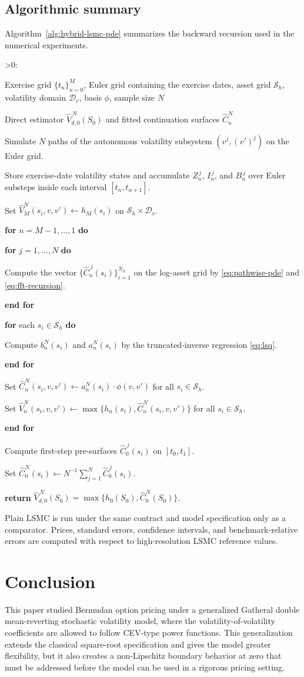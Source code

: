 \documentclass[10pt]{article}
\makeatletter
\newcounter{ALG@line}
\newenvironment{algorithmic}[1][0]{%
  \setcounter{ALG@line}{0}%
  \def\ALG@freq{#1}%
  \begin{list}{\ifnum\ALG@freq>0\refstepcounter{ALG@line}\arabic{ALG@line}:\fi}{%
    \setlength{\leftmargin}{2.2em}%
    \setlength{\labelwidth}{1.8em}%
    \setlength{\labelsep}{0.4em}%
    \setlength{\itemsep}{2pt}%
    \setlength{\parsep}{0pt}%
    \setlength{\topsep}{3pt}%
  }%
}{\end{list}}
\newcommand{\Require}{\item[\textbf{Require:}]}
\newcommand{\Ensure}{\item[\textbf{Ensure:}]}
\newcommand{\State}{\item}
\newcommand{\For}[1]{\State \textbf{for} #1 \textbf{do}}
\newcommand{\EndFor}{\State \textbf{end for}}
\theoremstyle{plain}
\theoremstyle{definition}
\theoremstyle{remark}
\makeatother
\begin{document}
\subsection{Algorithmic summary}
\label{subsec:algorithmic-summary}
Algorithm~\ref{alg:hybrid-lsmc-pde} summarizes the backward recursion used in the numerical experiments.

\begin{algorithm}
\caption{Hybrid LSMC--PDE recursion}\label{alg:hybrid-lsmc-pde}
\begin{algorithmic}[1]
\Require Exercise grid $\{t_n\}_{n=0}^M$, Euler grid containing the exercise dates, asset grid $\mathcal S_h$, volatility domain $\mathcal D_v$, basis $\phi$, sample size $N$
\Ensure Direct estimator $\widehat V_{d,0}^{\,N}(S_0)$ and fitted continuation surfaces $\widehat C_n^N$
\State Simulate $N$ paths of the autonomous volatility subsystem $(v^j,(v')^j)$ on the Euler grid.
\State Store exercise-date volatility states and accumulate $Z_n^{\,j}$, $I_n^{\,j}$, and $B_n^{\,j}$ over Euler substeps inside each interval $[t_n,t_{n+1}]$.
\State Set $\widehat V_M^N(s_i,v,v')\gets h_M(s_i)$ on $\mathcal S_h\times\mathcal D_v$.
\For{$n=M-1,\ldots,1$}
    \For{$j=1,\ldots,N$}
        \State Compute the vector $\{\widehat C_n^{\,j}(s_i)\}_{i=1}^{N_{\mathcal S}}$ on the log-asset grid by \eqref{eq:pathwise-pde} and \eqref{eq:fft-recursion}.
    \EndFor
    \For{each $s_i\in\mathcal S_h$}
        \State Compute $b_n^N(s_i)$ and $a_n^N(s_i)$ by the truncated-inverse regression \eqref{eq:lsq}.
    \EndFor
    \State Set $\widehat C_n^N(s_i,v,v')\gets a_n^N(s_i)\cdot\phi(v,v')$ for all $s_i\in\mathcal S_h$.
    \State Set $\widehat V_n^N(s_i,v,v')\gets\max\{h_n(s_i),\widehat C_n^N(s_i,v,v')\}$ for all $s_i\in\mathcal S_h$.
\EndFor
\State Compute first-step pre-surfaces $\widehat C_0^{\,j}(s_i)$ on $[t_0,t_1]$.
\State Set $\widehat C_0^N(s_i)\gets N^{-1}\sum_{j=1}^N\widehat C_0^{\,j}(s_i)$.
\State \textbf{return} $\widehat V_{d,0}^{\,N}(S_0)=\max\{h_0(S_0),\widehat C_0^N(S_0)\}$.
\end{algorithmic}
\end{algorithm}

Plain LSMC is run under the same contract and model specification only as a comparator. Prices, standard errors, confidence intervals, and benchmark-relative errors are computed with respect to high-resolution LSMC reference values.




\section{Conclusion}\label{sec:conclusion}
This paper studied Bermudan option pricing under a generalized Gatheral double mean-reverting stochastic volatility model, where the volatility-of-volatility coefficients are allowed to follow CEV-type power functions. This generalization extends the classical square-root specification and gives the model greater flexibility, but it also creates a non-Lipschitz boundary behavior at zero that must be addressed before the model can be used in a rigorous pricing setting.
\end{document}
